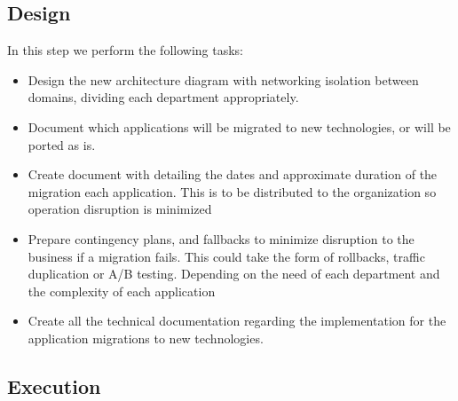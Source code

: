 \documentclass{llncs}
\begin{document}
\subsection{Design}

In this step we perform the following tasks:

\begin{itemize}

  \item Design the new architecture diagram with networking isolation between domains, dividing each department appropriately.
  \item Document which applications will be migrated to new technologies, or will be ported as is.
  \item Create document with detailing the dates and approximate duration of the migration each application. This is to be distributed to the organization so operation disruption is minimized
  \item Prepare contingency plans, and fallbacks to minimize disruption to the business if a migration fails. This could take the form of rollbacks, traffic duplication or A/B testing. Depending on the need of each department and the complexity of each application
  \item Create all the technical documentation regarding the implementation for the application migrations to new technologies.
\end{itemize}

\subsection{Execution}
\end{document}
